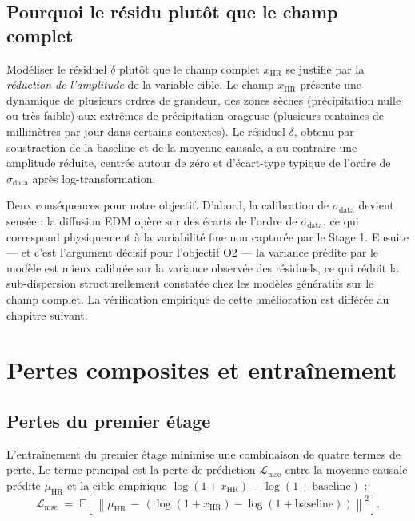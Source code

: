 \documentclass[14pt,a4paper,openany]{extreport}
\theoremstyle{definition}
\newcommand{\HR}{\ensuremath{\text{HR}}}
\newcommand{\xHR}{\ensuremath{x_{\HR}}}
\newcommand{\muHR}{\ensuremath{\mu_{\HR}}}
\newcommand{\Lmse}{\ensuremath{\mathcal{L}_{\mathrm{mse}}}}
\begin{document}
\subsection{Pourquoi le résidu plutôt que le champ complet}
\label{ssec:oracle-residu-justif}

Modéliser le résiduel $\delta$ plutôt que le champ complet $\xHR$ se justifie par la \emph{réduction de l'amplitude} de la variable cible. Le champ $\xHR$ présente une dynamique de plusieurs ordres de grandeur, des zones sèches (précipitation nulle ou très faible) aux extrêmes de précipitation orageuse (plusieurs centaines de millimètres par jour dans certains contextes). Le résiduel $\delta$, obtenu par soustraction de la baseline et de la moyenne causale, a au contraire une amplitude réduite, centrée autour de zéro et d'écart-type typique de l'ordre de $\sigma_{\mathrm{data}}$ après log-transformation.

Deux conséquences pour notre objectif. D'abord, la calibration de $\sigma_{\mathrm{data}}$ devient sensée : la diffusion EDM opère sur des écarts de l'ordre de $\sigma_{\mathrm{data}}$, ce qui correspond physiquement à la variabilité fine non capturée par le Stage 1. Ensuite --- et c'est l'argument décisif pour l'objectif O2 --- la variance prédite par le modèle est mieux calibrée sur la variance observée des résiduels, ce qui réduit la sub-dispersion structurellement constatée chez les modèles génératifs sur le champ complet. La vérification empirique de cette amélioration est différée au chapitre suivant.

\section{Pertes composites et entraînement}
\label{sec:oracle-pertes}

\subsection{Pertes du premier étage}
\label{ssec:oracle-pertes-stage1}

L'entraînement du premier étage minimise une combinaison de quatre termes de perte. Le terme principal est la perte de prédiction $\Lmse$ entre la moyenne causale prédite $\muHR$ et la cible empirique $\log(1 + \xHR) - \log(1 + \mathrm{baseline})$ :
\begin{equation}
  \Lmse \;=\; \mathbb{E}\!\left[\, \left\| \muHR \,-\, \left( \log(1 + \xHR) - \log(1 + \mathrm{baseline}) \right) \right\|^2 \right].
  \label{eq:loss-mse}
\end{equation}
\end{document}
